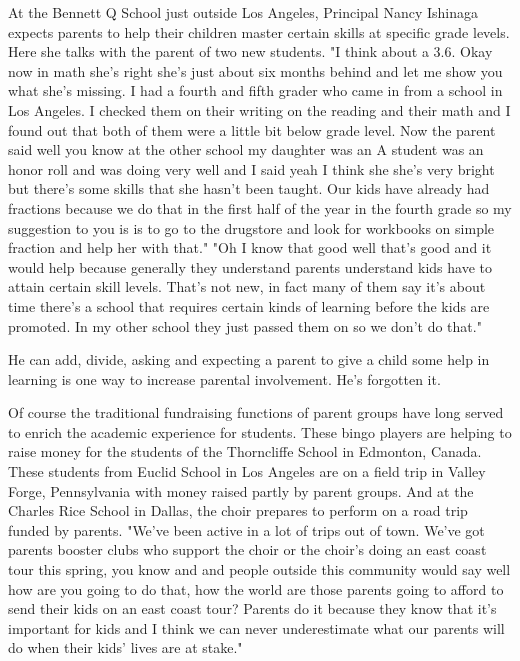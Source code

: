 At the Bennett Q School just outside Los Angeles, Principal Nancy Ishinaga expects parents to help their children master certain skills at specific grade levels.
Here she talks with the parent of two new students.
"I think about a 3.6.
Okay now in math she's right she's just about six months behind and let me show you what she's missing.
I had a fourth and fifth grader who came in from a school in Los Angeles.
I checked them on their writing on the reading and their math and I found out that both of them were a little bit below grade level.
Now the parent said well you know at the other school my daughter was an A student was an honor roll and was doing very well and I said yeah I think she she's very bright but there's some skills that she hasn't been taught.
Our kids have already had fractions because we do that in the first half of the year in the fourth grade so my suggestion to you is is to go to the drugstore and look for workbooks on simple fraction and help her with that." "Oh I know that good well that's good and it would help because generally they understand parents understand kids have to attain certain skill levels.
That's not new, in fact many of them say it's about time there's a school that requires certain kinds of learning before the kids are promoted.
In my other school they just passed them on so we don't do that."

He can add, divide, asking and expecting a parent to give a child some help in learning is one way to increase parental involvement.
He's forgotten it.

Of course the traditional fundraising functions of parent groups have long served to enrich the academic experience for students.
These bingo players are helping to raise money for the students of the Thorncliffe School in Edmonton, Canada.
These students from Euclid School in Los Angeles are on a field trip in Valley Forge, Pennsylvania with money raised partly by parent groups.
And at the Charles Rice School in Dallas, the choir prepares to perform on a road trip funded by parents.
"We've been active in a lot of trips out of town.
We've got parents booster clubs who support the choir or the choir's doing an east coast tour this spring, you know and and people outside this community would say well how are you going to do that, how the world are those parents going to afford to send their kids on an east coast tour?
Parents do it because they know that it's important for kids and I think we can never underestimate what our parents will do when their kids' lives are at stake."

